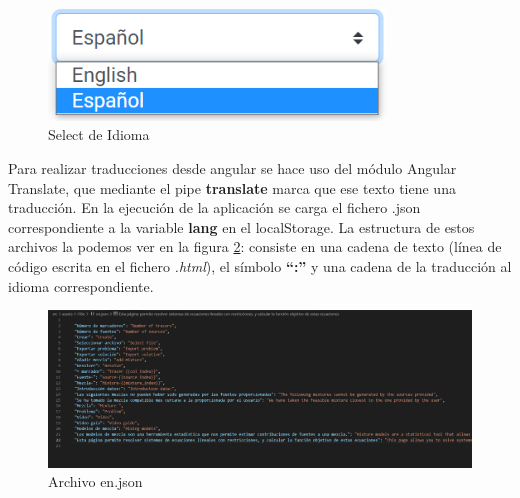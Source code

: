 \begin{figure}[h!] 
\centering
    \includegraphics[width=0.8\textwidth]{img/selectIdiom.PNG}
\caption{Select de Idioma}
\label{fig:selectidiom}
\end{figure}

\newpage
Para realizar traducciones desde angular se hace uso del módulo Angular Translate, que mediante el pipe \textbf{translate} marca que ese texto tiene una traducción. En la ejecución de la aplicación se carga el fichero .json correspondiente a la variable \textbf{lang} en el localStorage. La estructura de estos archivos la podemos ver en la figura \ref{fig:en_json}: consiste en una cadena de texto (línea de código escrita en el fichero \emph{.html}), el símbolo \textbf{``:''} y una cadena de la traducción al idioma correspondiente.

\begin{figure}[h!] 
\centering
    \includegraphics[width=1\textwidth]{img/en_json.PNG}
\caption{Archivo en.json}
\label{fig:en_json}
\end{figure}








